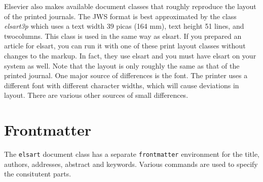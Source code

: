 \documentclass{elsart3p}    %
\begin{document}
Elsevier also makes available document classes that roughly
reproduce the layout of the printed journals. The JWS format
is best approximated by the class {\em elsart3p} which uses
a text width 39 picas (164 mm), text height 51 lines, and
twocolumns.  This class is used in the same way as
elsart. If you prepared an article for elsart, you can run
it with one of these print layout classes without changes to
the markup. In fact, they use elsart and you must have
elsart on your system as well.  Note that the layout is only
roughly the same as that of the printed journal. One major
source of differences is the font. The printer uses a
different font with different character widths, which will
cause deviations in layout. There are various other sources
of small differences.

\section{Frontmatter}
\label{frontmatter}

The \texttt{elsart} document class has a separate
\texttt{frontmatter} environment for the title, authors,
addresses, abstract and keywords.  Various commands are used
to specify the consitutent parts.
\end{document}
